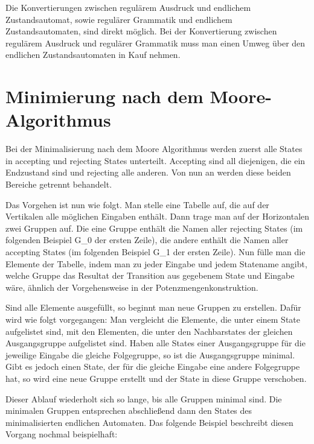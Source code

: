 Die Konvertierungen zwischen regul\"arem Ausdruck und endlichem Zustandsautomat, sowie regul\"arer Grammatik und endlichem Zustandsautomaten, sind direkt m\"oglich. Bei der Konvertierung zwischen regul\"arem Ausdruck und regul\"arer Grammatik muss man einen Umweg \"uber den endlichen Zustandsautomaten in  Kauf nehmen.



\section{Minimierung nach dem Moore-Algorithmus}

Bei der Minimalisierung nach dem Moore Algorithmus werden zuerst alle States in accepting und rejecting States unterteilt. Accepting sind all diejenigen, die ein Endzustand sind und rejecting alle anderen. Von nun  an werden diese beiden Bereiche getrennt behandelt.

Das Vorgehen ist nun wie folgt. Man stelle eine Tabelle auf, die auf der Vertikalen alle m\"oglichen Eingaben enth\"alt. Dann trage man auf der Horizontalen zwei Gruppen auf. Die eine Gruppe enth\"alt die Namen aller rejecting States (im folgenden Beispiel G\_0 der ersten Zeile), die andere enth\"alt die Namen aller accepting States (im folgenden Beispiel G\_1 der ersten Zeile). Nun f\"ulle man die Elemente der Tabelle, indem man zu jeder Eingabe und jedem Statename angibt, welche Gruppe das Resultat der Transition aus gegebenem State und Eingabe w\"are, \"ahnlich der Vorgehensweise in der Potenzmengenkonstruktion.
 
Sind alle Elemente ausgef\"ullt, so beginnt man neue Gruppen zu erstellen. Daf\"ur wird wie folgt vorgegangen: Man vergleicht die Elemente, die unter einem State aufgelistet sind, mit den Elementen, die unter den Nachbarstates der gleichen Ausgangsgruppe aufgelistet sind. Haben alle States einer Ausgangsgruppe f\"ur die jeweilige Eingabe die gleiche Folgegruppe, so ist die Ausgangsgruppe minimal. Gibt es jedoch einen State, der f\"ur die gleiche Eingabe eine andere Folgegruppe hat, so wird eine neue Gruppe erstellt und der State in diese Gruppe verschoben.

Dieser Ablauf wiederholt sich so lange, bis alle Gruppen minimal sind. Die minimalen Gruppen entsprechen abschließend dann den States des minimalisierten endlichen Automaten. Das folgende Beispiel beschreibt diesen Vorgang nochmal beispielhaft:

